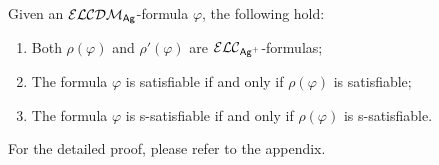 \documentclass{article}
\newcommand{\ag}{\text{\normalfont\textsf{Ag}}\xspace}
\renewcommand{\phi}{\varphi}
\newcommand{\langc}{\ensuremath{\mathcal{ELC}}\xspace}
\newcommand{\langcdm}{\ensuremath{\mathcal{ELCDM}}\xspace}
\begin{document}
\begin{propositionrep}\label{lem:sat-cdm2c}
Given an $\langcdm_\ag$-formula $\phi$, the following hold:
\begin{enumerate}
\item \label{it:sat-langc} Both $\rho(\phi)$ and $\rho'(\phi)$ are $\langc_{\ag^+}$-formulas;
\item \label{it:sat-cdm2c} The formula $\phi$ is satisfiable if and only if $\rho(\phi)$ is satisfiable;
\item \label{it:ssat-cdm2c} The formula $\phi$ is s-satisfiable if and only if $\rho(\phi)$ is s-satisfiable.
\end{enumerate}
\end{propositionrep}
\begin{inlineproof}
For the detailed proof, please refer to the appendix.
\end{inlineproof}
\end{document}
